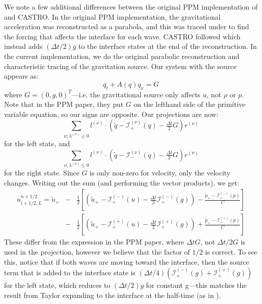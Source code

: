 \documentclass{emulateapj}
\newcommand{\evm}{{(-)}}
\newcommand{\evp}{{(+)}}
\newcommand{\enu}{{(\nu)}}
\begin{document}
We note a few additional differences between the original PPM
implementation of \citet{ppm} and CASTRO.  In the original PPM
implementation, the gravitational acceleration was reconstructed as a parabola, and
this was traced under to find the forcing that affects the interface
for each wave.  CASTRO followed \citet{ppmunsplit} which instead adds
$(\Delta t/2)g$ to the interface states at the end of the
reconstruction.  In the current implementation, we do the original
parabolic reconstruction and characteristic tracing of the gravitation
source.  Our system with the source appears as:
\begin{equation}
q_t + A(q) q_x = G
\end{equation}
where $G = (0, g, 0)^T$---i.e. the gravitational source only affects
$u$, not $\rho$ or $p$.  Note that in the PPM paper, they put $G$ on 
the lefthand side of the primitive variable equation, so our signs are
opposite.  Our projections are now:
\begin{equation}
\sum_{\nu; \lambda^\enu \ge 0}l^\enu \cdot (\tilde{q} - \mathcal{I}^\enu_+(q) - \tfrac{\Delta t}{2} G) r^\enu
\end{equation}
for the left state, and
\begin{equation}
\sum_{\nu; \lambda^\enu \le 0} l^\enu \cdot (\tilde{q} - \mathcal{I}^\enu_-(q) - \tfrac{\Delta t}{2} G) r^\enu 
\end{equation}
for the right state.  Since $G$ is only non-zero for velocity, only
the velocity changes.  Writing out the sum (and performing the vector products), we
get:
\begin{eqnarray}
u_{i+1/2,L}^{n+1/2} =
   \tilde{u}_+ 
  &-& \frac{1}{2} \left [
      \left (\tilde{u}_+ - \mathcal{I}_+^\evm(u) - \frac{\Delta t}{2} \mathcal{I}^\evm_+(g) \right ) - 
       \frac{\tilde{p}_+ - \mathcal{I}_+^\evm(p)}{C} \right ] \nonumber \\
  &-& \frac{1}{2} \left [
      \left (\tilde{u}_+ - \mathcal{I}_+^\evp(u) - \frac{\Delta t}{2} \mathcal{I}^\evp_+(g) \right ) +
       \frac{\tilde{p}_+ - \mathcal{I}_+^\evp(p)}{C} \right ]
\end{eqnarray}
These differ from the expression in the PPM paper, where $\Delta t G$,
not $\Delta t/2 G$ is used in the projection, however we believe that
the factor of $1/2$ is correct.  To see this, notice that if both
waves are moving toward the interface, then the source term that is
added to the interface state is $(\Delta t/4) (\mathcal{I}_+^\evm(g) +
\mathcal{I}_+^\evp(g))$ for the left state, which reduces to $(\Delta
t/2) g$ for constant g---this matches the result from Taylor
expanding to the interface at the half-time (as in \citealt{ppmunsplit}).
\end{document}
